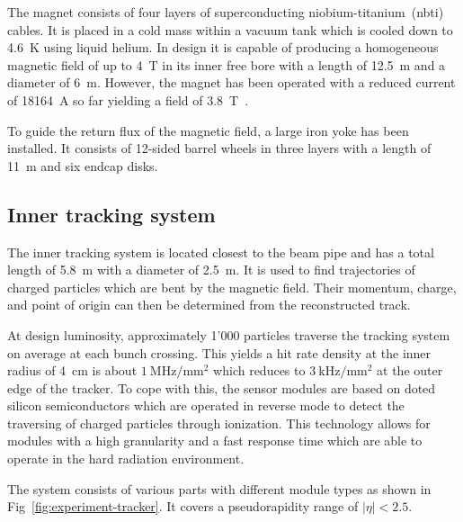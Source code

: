 The magnet consists of four layers of superconducting niobium-titanium~(\gls{nbti}) cables. It is placed in a cold mass within a vacuum tank which is cooled down to 4.6~K using liquid helium. In design it is capable of producing a homogeneous magnetic field of up to 4~T in its inner free bore with a length of 12.5~m and a diameter of 6~m. However, the magnet has been operated with a reduced current of 18164~A so far yielding a field of 3.8~T~\cite{Chatrchyan:2009si}. 

To guide the return flux of the magnetic field, a large iron yoke has been installed. It consists of 12-sided barrel wheels in three layers with a length of 11~m and six endcap disks. 

\subsection{Inner tracking system}

The inner tracking system is located closest to the beam pipe and has a total length of 5.8~m with a diameter of 2.5~m. It is used to find trajectories of charged particles which are bent by the magnetic field. Their momentum, charge, and point of origin can then be determined from the reconstructed track. 

At design luminosity, approximately 1'000 particles traverse the tracking system on average at each bunch crossing. This yields a hit rate density at the inner radius of 4~cm is about $1~\mathrm{MHz/mm^2}$ which reduces to $3~\mathrm{kHz/mm^2}$ at the outer edge of the tracker. To cope with this, the sensor modules are based on doted silicon semiconductors which are operated in reverse mode to detect the traversing of charged particles through ionization. This technology allows for modules with a high granularity and a fast response time which are able to operate in the hard radiation environment.

The system consists of various parts with different module types as shown in Fig~\ref{fig:experiment-tracker}. It covers a pseudorapidity range of $|\eta|<2.5$.


